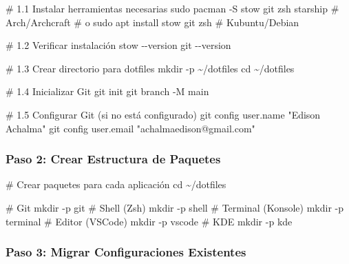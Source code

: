 \documentclass[
  doc,
  floatsintext,
  longtable,
  a4paper,
  nolmodern,
  notxfonts,
  notimes,
  12pt,
  colorlinks=true,linkcolor=blue,citecolor=blue,urlcolor=blue]{apa7}
\newenvironment{Shaded}{\begin{snugshade}}{\end{snugshade}}
\newcommand{\AttributeTok}[1]{\textcolor[rgb]{0.40,0.45,0.13}{#1}}
\newcommand{\BuiltInTok}[1]{\textcolor[rgb]{0.00,0.23,0.31}{#1}}
\newcommand{\CommentTok}[1]{\textcolor[rgb]{0.37,0.37,0.37}{#1}}
\newcommand{\ExtensionTok}[1]{\textcolor[rgb]{0.00,0.23,0.31}{#1}}
\newcommand{\FunctionTok}[1]{\textcolor[rgb]{0.28,0.35,0.67}{#1}}
\newcommand{\NormalTok}[1]{\textcolor[rgb]{0.00,0.23,0.31}{#1}}
\newcommand{\StringTok}[1]{\textcolor[rgb]{0.13,0.47,0.30}{#1}}
\begin{document}
\begin{Shaded}
\begin{Highlighting}[]
\CommentTok{\# 1.1 Instalar herramientas necesarias}
\FunctionTok{sudo}\NormalTok{ pacman }\AttributeTok{{-}S}\NormalTok{ stow git zsh starship  }\CommentTok{\# Arch/Archcraft}
\CommentTok{\# o}
\FunctionTok{sudo}\NormalTok{ apt install stow git zsh        }\CommentTok{\# Kubuntu/Debian}

\CommentTok{\# 1.2 Verificar instalación}
\ExtensionTok{stow} \AttributeTok{{-}{-}version}
\FunctionTok{git} \AttributeTok{{-}{-}version}

\CommentTok{\# 1.3 Crear directorio para dotfiles}
\FunctionTok{mkdir} \AttributeTok{{-}p}\NormalTok{ \textasciitilde{}/dotfiles}
\BuiltInTok{cd}\NormalTok{ \textasciitilde{}/dotfiles}

\CommentTok{\# 1.4 Inicializar Git}
\FunctionTok{git}\NormalTok{ init}
\FunctionTok{git}\NormalTok{ branch }\AttributeTok{{-}M}\NormalTok{ main}

\CommentTok{\# 1.5 Configurar Git (si no está configurado)}
\FunctionTok{git}\NormalTok{ config user.name }\StringTok{"Edison Achalma"}
\FunctionTok{git}\NormalTok{ config user.email }\StringTok{"achalmaedison@gmail.com"}
\end{Highlighting}
\end{Shaded}

\subsubsection{Paso 2: Crear Estructura de
Paquetes}\label{paso-2-crear-estructura-de-paquetes}

\begin{Shaded}
\begin{Highlighting}[]
\CommentTok{\# Crear paquetes para cada aplicación}
\BuiltInTok{cd}\NormalTok{ \textasciitilde{}/dotfiles}

\CommentTok{\# Git}
\FunctionTok{mkdir} \AttributeTok{{-}p}\NormalTok{ git}
\CommentTok{\# Shell (Zsh)}
\FunctionTok{mkdir} \AttributeTok{{-}p}\NormalTok{ shell}
\CommentTok{\# Terminal (Konsole)}
\FunctionTok{mkdir} \AttributeTok{{-}p}\NormalTok{ terminal}
\CommentTok{\# Editor (VSCode)}
\FunctionTok{mkdir} \AttributeTok{{-}p}\NormalTok{ vscode}
\CommentTok{\# KDE}
\FunctionTok{mkdir} \AttributeTok{{-}p}\NormalTok{ kde}
\end{Highlighting}
\end{Shaded}

\subsubsection{Paso 3: Migrar Configuraciones
Existentes}\label{paso-3-migrar-configuraciones-existentes}
\end{document}
